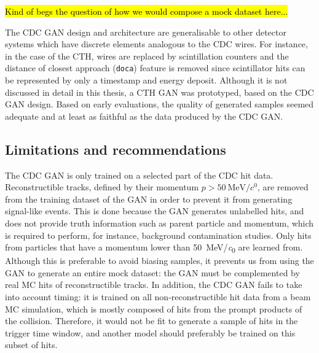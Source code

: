 \hl{Kind of begs the question of how we would compose a mock dataset here...}





The CDC GAN design and architecture are generalisable to other detector systems
which have discrete elements analogous to the CDC wires. For instance, in the
case of the CTH, wires are replaced by scintillation counters and the distance
of closest approach (\texttt{doca}) feature is removed since scintillator hits
can be represented by only a timestamp and energy deposit. Although it is not
discussed in detail in this thesis, a CTH GAN was prototyped, based on the CDC
GAN design. Based on early evaluations, the quality of generated samples seemed
adequate and at least as faithful as the data produced by the CDC GAN.



\subsection{Limitations and recommendations}
The CDC GAN is only trained on a selected part of the CDC hit data.
Reconstructible tracks, defined by their momentum $p>\SI{50}{\MeV/\clight}$, are
removed from the training dataset of the GAN in order to prevent it from
generating signal-like events. This is done because the GAN generates unlabelled
hits, and does not provide truth information such as parent particle and
momentum, which is required to perform, for instance, background contamination
studies.
Only hits from particles that have a momentum lower than \SI{50}{\MeV/\clight}
are learned from. Although this is preferable to avoid biasing samples, it
prevents us from using the GAN to generate an entire mock dataset: the GAN must
be complemented by real MC hits of reconstructible tracks. In addition, the CDC
GAN fails to take into account timing: it is trained on all non-reconstructible
hit data from a beam MC simulation, which is mostly composed of hits from the
prompt products of the collision. Therefore, it would not be fit to generate a
sample of hits in the trigger time window, and another model should preferably
be trained on this subset of hits.

